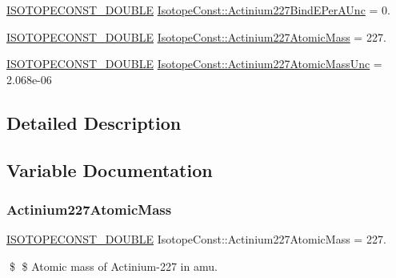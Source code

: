 \begin{DoxyCompactItemize}
\mbox{\hyperlink{group___isotope_const-_macros_ga8f45a7272ce02c0b4c65c44636ed719a}{I\+S\+O\+T\+O\+P\+E\+C\+O\+N\+S\+T\+\_\+\+D\+O\+U\+B\+LE}} \mbox{\hyperlink{group___isotope_const-_actinium-_ac227_ga33ed4f5904f12861d800f706e7fdd063}{Isotope\+Const\+::\+Actinium227\+Bind\+E\+Per\+A\+Unc}} = 0.
\item 
\mbox{\hyperlink{group___isotope_const-_macros_ga8f45a7272ce02c0b4c65c44636ed719a}{I\+S\+O\+T\+O\+P\+E\+C\+O\+N\+S\+T\+\_\+\+D\+O\+U\+B\+LE}} \mbox{\hyperlink{group___isotope_const-_actinium-_ac227_ga9baa864691b014ab2ed99e91c310d910}{Isotope\+Const\+::\+Actinium227\+Atomic\+Mass}} = 227.
\item 
\mbox{\hyperlink{group___isotope_const-_macros_ga8f45a7272ce02c0b4c65c44636ed719a}{I\+S\+O\+T\+O\+P\+E\+C\+O\+N\+S\+T\+\_\+\+D\+O\+U\+B\+LE}} \mbox{\hyperlink{group___isotope_const-_actinium-_ac227_ga35735dd152ecf71d24ea1cc94690cc74}{Isotope\+Const\+::\+Actinium227\+Atomic\+Mass\+Unc}} = 2.\+068e-\/06
\end{DoxyCompactItemize}


\subsection{Detailed Description}


\subsection{Variable Documentation}
\mbox{\label{group___isotope_const-_actinium-_ac227_ga9baa864691b014ab2ed99e91c310d910}} 
\subsubsection{\texorpdfstring{Actinium227\+Atomic\+Mass}{Actinium227AtomicMass}}
{\footnotesize\ttfamily \mbox{\hyperlink{group___isotope_const-_macros_ga8f45a7272ce02c0b4c65c44636ed719a}{I\+S\+O\+T\+O\+P\+E\+C\+O\+N\+S\+T\+\_\+\+D\+O\+U\+B\+LE}} Isotope\+Const\+::\+Actinium227\+Atomic\+Mass = 227.}

\$ \$ Atomic mass of Actinium-\/227 in amu. \mbox{\label{group___isotope_const-_actinium-_ac227_ga35735dd152ecf71d24ea1cc94690cc74}} 
